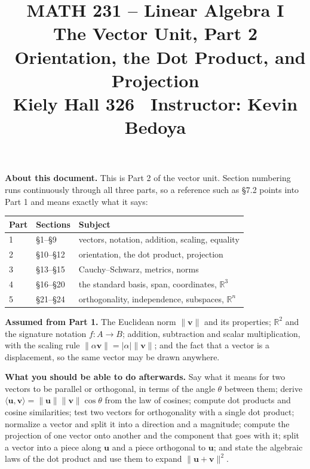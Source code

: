 \documentclass[11pt]{article}
\title{\vspace{-1.2cm}\textbf{\sffamily MATH 231 -- Linear Algebra I}\\[4pt]
       {\large\sffamily The Vector Unit, Part 2 \textbullet\ Orientation,
        the Dot Product, and Projection}\\[2pt]
       {\normalsize\sffamily Kiely Hall 326 \textbullet\
        Instructor: Kevin Bedoya}}
\author{}
\date{}
\theoremstyle{definition}
\theoremstyle{remark}
\newcommand{\R}{\mathbb{R}}
\newcommand{\vc}[1]{\mathbf{#1}}
\newcommand{\norm}[1]{\lVert #1\rVert}
\begin{document}
\setcounter{section}{9}   %
\maketitle
\vspace{-1.6cm}

\noindent\textbf{About this document.} This is Part 2 of the vector unit.
Section numbering runs continuously through all three parts, so a reference such
as \S7.2 points into Part 1 and means exactly what it says:

\begin{center}
\renewcommand{\arraystretch}{1.2}
\begin{tabular}{@{}l l l@{}}
\toprule
\textbf{Part} & \textbf{Sections} & \textbf{Subject} \\
\midrule
1 & \S1--\S9   & vectors, notation, addition, scaling, equality \\
2 & \S10--\S12 & orientation, the dot product, projection \\
3 & \S13--\S15 & Cauchy--Schwarz, metrics, norms \\
4 & \S16--\S20  & the standard basis, span, coordinates, $\R^{3}$ \\
5 & \S21--\S24  & orthogonality, independence, subspaces, $\R^{n}$ \\
\bottomrule
\end{tabular}
\end{center}

\noindent\textbf{Assumed from Part 1.} The Euclidean norm $\norm{\vc{v}}$ and
its properties; $\R^{2}$ and the signature notation $f:A\to B$; addition,
subtraction and scalar multiplication, with the scaling rule
$\norm{\alpha\vc{v}}=\lvert\alpha\rvert\norm{\vc{v}}$; and the fact that a
vector is a displacement, so the same vector may be drawn anywhere.

\medskip
\noindent\textbf{What you should be able to do afterwards.} Say what it means
for two vectors to be parallel or orthogonal, in terms of the angle $\theta$
between them; derive
$\langle\vc{u},\vc{v}\rangle=\norm{\vc{u}}\norm{\vc{v}}\cos\theta$ from the law
of cosines; compute dot products and cosine similarities; test two vectors for
orthogonality with a single dot product; normalize a vector and split it into a
direction and a magnitude; compute the projection of one vector onto another and
the component that goes with it; split a vector into a piece along $\vc{u}$ and a
piece orthogonal to $\vc{u}$; and state the algebraic laws of the dot product and
use them to expand $\norm{\vc{u}+\vc{v}}^{2}$.
\end{document}
